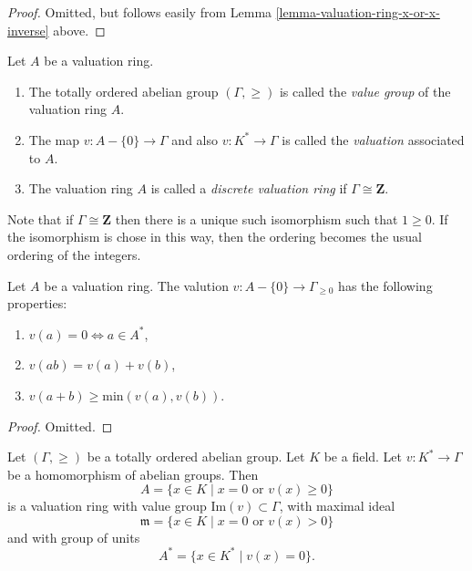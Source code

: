 \begin{proof}
Omitted, but follows easily from
Lemma \ref{lemma-valuation-ring-x-or-x-inverse} above.
\end{proof}

\begin{definition}
\label{definition-value-group}
Let $A$ be a valuation ring.
\begin{enumerate}
\item The totally ordered abelian group $(\Gamma, \geq)$ is called the
{\it value group} of the valuation ring $A$.
\item The map $v : A - \{0\} \to \Gamma$ and also $v : K^* \to \Gamma$ is
called the {\it valuation} associated to $A$.
\item The valuation ring $A$ is called a {\it discrete valuation ring}
if $\Gamma \cong \mathbf{Z}$.
\end{enumerate}
\end{definition}

\noindent
Note that if $\Gamma \cong \mathbf{Z}$ then there is a unique such
isomorphism such that $1 \geq 0$. If the isomorphism is chose in this
way, then the ordering becomes the usual ordering of the integers.

\begin{lemma}
\label{lemma-properties-valuation}
Let $A$ be a valuation ring. The valution $v : A -\{0\} \to \Gamma_{\geq 0}$
has the following properties:
\begin{enumerate}
\item $v(a) = 0 \Leftrightarrow a \in A^*$,
\item $v(ab) = v(a) + v(b)$,
\item $v(a + b) \geq \text{min}(v(a), v(b))$.
\end{enumerate}
\end{lemma}

\begin{proof}
Omitted.
\end{proof}

\begin{lemma}
\label{lemma-valuation-valuation-ring}
Let $(\Gamma, \geq)$ be a totally ordered abelian group.
Let $K$ be a field. Let $v : K^* \to \Gamma$ be a homomorphism
of abelian groups. Then
$$
A =
\{
x \in K \mid x = 0 \text{ or } v(x) \geq 0
\}
$$
is a valuation ring with value group $\text{Im}(v) \subset \Gamma$,
with maximal ideal
$$
\mathfrak m =
\{
x \in K \mid x = 0 \text{ or } v(x) > 0
\}
$$
and with group of units
$$
A^* =
\{
x \in K^* \mid v(x) = 0
\}.
$$
\end{lemma}


